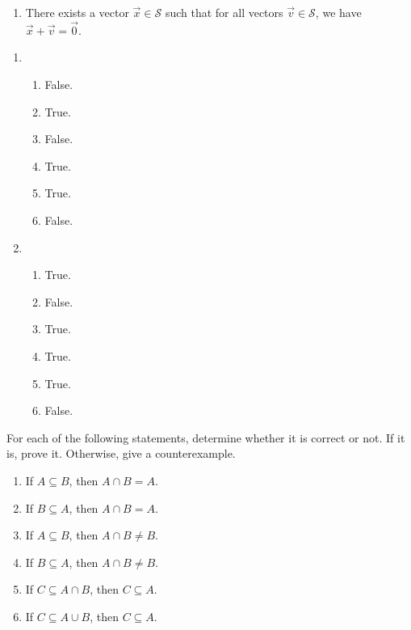 \begin{exercises}
\begin{problist}
\begin{enumerate}
\begin{enumerate}
					\item There exists a vector $\vec x \in \mathcal{S}$ such that for
						all vectors $\vec v \in \mathcal{S}$, we have $\vec x + \vec v =
						\vec 0$.
				\end{enumerate}
		\end{enumerate}
		\begin{solution}
			\begin{enumerate}
				\item 
				\begin{enumerate}
					\item False.
					\item True.
					\item False.
					\item True.
					\item True.
					\item False.
				\end{enumerate}
				\item 
				\begin{enumerate}
					\item True.
					\item False.
					\item True.
					\item True.
					\item True.
					\item False.
				\end{enumerate}
			\end{enumerate}
		\end{solution}

		\prob %
		For each of the following statements, determine whether it is correct or not. If
		it is, prove it. Otherwise, give a counterexample.
		\begin{enumerate}
			\item If $A \subseteq B$, then $A \cap B = A$.

			\item If $B \subseteq A$, then $A \cap B = A$.

			\item If $A \subseteq B$, then $A \cap B \neq B$.

			\item If $B \subseteq A$, then $A \cap B \neq B$.

			\item If $C \subseteq A \cap B$, then $C \subseteq A$.

			\item If $C \subseteq A \cup B$, then $C \subseteq A$.


\end{enumerate}
\end{problist}
\end{exercises}
